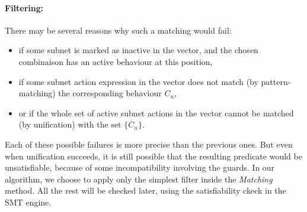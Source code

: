 \documentclass{lncs/llncs}
\begin{document}
\paragraph{Filtering:}
There may be several reasons why such a matching would fail:
\begin{itemize}
  \item if some subnet is marked as inactive in the vector, and the
    chosen combinaison has an active behaviour at this position,
  \item if some subnet action expression in the vector does not match (by
    pattern-matching) the corresponding behaviour $C_n$,
  \item or if the whole set of active subnet actions in the vector
    cannot be matched (by unification) with the set $\{C_n\}$.
\end {itemize}

Each of these possible failures is more precise than the previous
ones. But even when unification succeeds, it is still possible that
the resulting predicate would be unsatisfiable, because of some
incompatibility involving the guards. In our algorithm, we choose to
apply only the simplest filter inside the \emph{Matching} method. All
the rest will be checked later, using the satisfiability ckeck in the
SMT engine.
\end{document}
